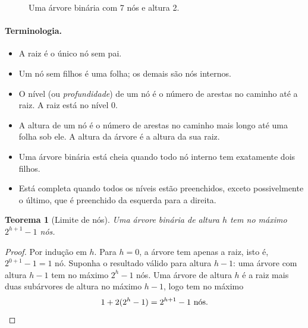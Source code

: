 \documentclass[9pt,a4paper]{extarticle}
\newcommand{\impt}[1]{\textcolor{important}{#1}}
\newtheorem{theorem}{Teorema}[section]
\theoremstyle{definition}
\begin{document}
\begin{figure}[h]
\centering
{}
\caption{Uma árvore binária com 7 nós e altura 2.}
\end{figure}

\paragraph{Terminologia.}
\begin{itemize}
    \item A \impt{raiz} é o único nó sem pai.
    \item Um nó sem filhos é uma \impt{folha}; os demais são \impt{nós internos}.
    \item O \impt{nível} (ou \emph{profundidade}) de um nó é o número de arestas no caminho até a raiz. A raiz está no nível $0$.
    \item A \impt{altura} de um nó é o número de arestas no caminho mais longo até uma folha sob ele. A altura da árvore é a altura da sua raiz.
    \item Uma árvore binária está \impt{cheia} quando todo nó interno tem exatamente dois filhos.
    \item Está \impt{completa} quando todos os níveis estão preenchidos, exceto possivelmente o último, que é preenchido da esquerda para a direita.
\end{itemize}

\begin{theorem}[Limite de nós]
Uma árvore binária de altura $h$ tem no máximo $2^{h+1} - 1$ nós.
\end{theorem}

\begin{proof}
Por indução em $h$. Para $h = 0$, a árvore tem apenas a raiz, isto é, $2^{0+1} - 1 = 1$ nó. Suponha o resultado válido para altura $h-1$: uma árvore com altura $h-1$ tem no máximo $2^{h} - 1$ nós. Uma árvore de altura $h$ é a raiz mais duas subárvores de altura no máximo $h-1$, logo tem no máximo
\[
1 + 2(2^h - 1) = 2^{h+1} - 1 \text{ nós.} \qedhere
\]
\end{proof}
\end{document}
